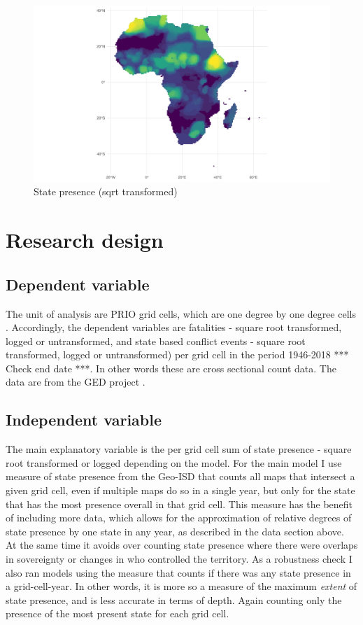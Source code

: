 \documentclass[12pt]{article}
\begin{document}
\begin{figure}[htpb]
	\centering
	\includegraphics[width=\linewidth]{../R/Output/sp_os_sum_any_plot.pdf}
	\caption{State presence (sqrt transformed)}
	\label{Sp}
\end{figure}

\section{Research design}

\subsection{Dependent variable}

The unit of analysis are PRIO grid cells, which are one degree by one degree
cells \citep{Tollefsen2012}. Accordingly, the dependent variables are fatalities
- square root transformed, logged or untransformed, and state based conflict
events - square root transformed, logged or untransformed) per grid cell in the
period 1946-2018 *** Check end date ***. In other words these are cross
sectional count data. The data are from the GED project \citep{Sundberg2013}.

\subsection{Independent variable}

The main explanatory variable is the per grid cell sum of state presence -
square root transformed or logged depending on the model. For the main model I
use measure of state presence from the Geo-ISD that counts all maps that
intersect a given grid cell, even if multiple maps do so in a single year, but
only for the state that has the most presence overall in that grid cell. This
measure has the benefit of including more data, which allows for the
approximation of relative degrees of state presence by one state in any year, as
described in the data section above. At the same time it avoids over counting
state presence where there were overlaps in sovereignty or changes in who
controlled the territory. As a robustness check I also ran models using the
measure that counts if there was any state presence in a grid-cell-year. In
other words, it is more so a measure of the maximum \textit{extent} of state
presence, and is less accurate in terms of depth. Again counting only the
presence of the most present state for each grid cell.
\end{document}
